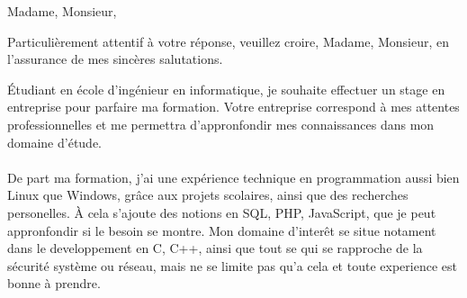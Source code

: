 \documentclass[10pt,a4paper,sans]{moderncv}        %
\begin{document}
\clearpage
\date{Le samedi 1 juin 2013}
\opening{Madame, Monsieur,}
\closing{Particulièrement attentif à votre réponse, veuillez croire, Madame, Monsieur, en l’assurance de mes sincères salutations.}
\makelettertitle

Étudiant en école d'ingénieur en informatique, je souhaite effectuer un stage en entreprise pour parfaire ma formation. Votre entreprise correspond à mes attentes professionnelles et me permettra d'appronfondir mes connaissances dans mon domaine d'étude.
\\~\\
De part ma formation, j'ai une expérience technique en programmation aussi bien Linux que Windows, grâce aux projets scolaires, ainsi que des recherches personelles. À cela s'ajoute des notions en SQL, PHP, JavaScript, que je peut appronfondir si le besoin se montre. Mon domaine d'interêt se situe notament dans le developpement en C, C++, ainsi que tout se qui se rapproche de la sécurité système ou réseau, mais ne se limite pas qu'a cela et toute experience est bonne à prendre.
\\~\\

\makeletterclosing

\end{document}
